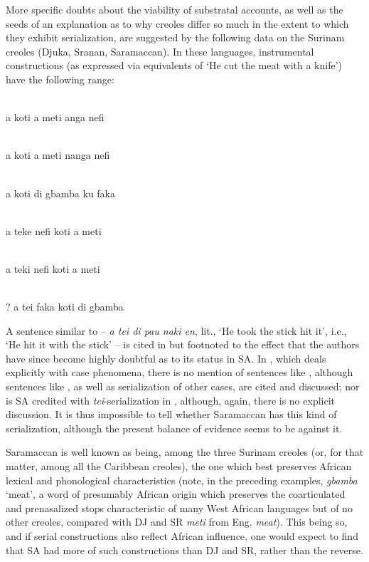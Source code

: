 More specific doubts about the viability of substratal accounts, as well as the seeds of an explanation as to why creoles differ so much in the extent to which they exhibit serialization, are suggested by the following data on the Surinam creoles (Djuka, Sranan, Saramaccan). In these languages, instrumental constructions (as expressed via equiva\-lents of `He cut the meat with a knife') have the following range:

\ea\label{ex:2:228}
\langinfo{\langDJ}{}{}\\
a koti a meti anga nefi
\z

\ea\label{ex:2:229}
\langinfo{\langSR}{}{}\\
a koti a meti nanga nefi
\z

\ea\label{ex:2:230}
\langinfo{\langSA}{}{}\\
a koti di gbamba ku faka
\z

\ea\label{ex:2:231}
\langinfo{\langDJ}{}{}\\
a teke nefi koti a meti
\z

\ea\label{ex:2:232}
\langinfo{\langSR}{}{}\\
a teki nefi koti a meti
\z

\ea\label{ex:2:233}
\langinfo{\langSA}{}{}\\
\textnormal{?} a tei faka koti di gbamba
\z

\noindent A sentence similar to  -- \textit{a tei di pau naki en}, lit., `He took the stick hit it', i.e., `He hit it with the stick' -- is cited in \citet{GrimesEtAl1970} but footnoted to the effect that the authors have since become highly doubtful as to its status in SA. In \citet{Glock1972}, which deals explicitly with case phenomena, there is no mention of sentences like , although sentences like , as well as serialization of other cases, are cited and discussed; nor is SA credited with \textit{tei}-serialization in \citet{JansenEtAl1978}, although, again, there is no explicit discussion. It is thus impossible to tell whether Saramaccan has this kind of serialization, although the present balance of evidence seems to be against it.

Saramaccan is well known as being, among the three Surinam creoles (or, for that matter, among all the Caribbean creoles), the one which best preserves African lexical and phonological characteristics
(note, in the preceding examples, \textit{gbamba} `meat', a word of presumably African origin which preserves the coarticulated and prenasalized stops characteristic of many West African languages but of no other creoles, compared with DJ and SR \textit{meti} from Eng. \textit{meat}). This being so, and if serial constructions also reflect African influence, one would expect to find that SA had more of such constructions than DJ and SR, rather than the reverse.

